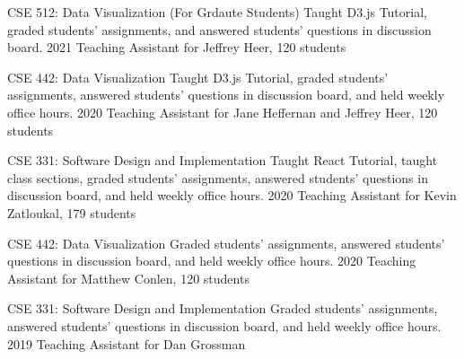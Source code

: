 

\begin{cvpubs}

  \cvteach
    {CSE 512: Data Visualization (For Grdaute Students)} %
    {Taught D3.js Tutorial, graded students' assignments, and answered students' questions in discussion board.} %
    {2021} %
    {Teaching Assistant for Jeffrey Heer, 120 students} %

  \cvteach
    {CSE 442: Data Visualization} %
    {Taught D3.js Tutorial, graded students' assignments, answered students' questions in discussion board, and held weekly office hours.} %
    {2020} %
    {Teaching Assistant for Jane Heffernan and Jeffrey Heer, 120 students} %

  \cvteach
    {CSE 331: Software Design and Implementation} %
    {Taught React Tutorial, taught class sections, graded students' assignments, answered students' questions in discussion board, and held weekly office hours.} %
    {2020} %
    {Teaching Assistant for Kevin Zatloukal, 179 students} %

  \cvteach
    {CSE 442: Data Visualization} %
    {Graded students' assignments, answered students' questions in discussion board, and held weekly office hours.} %
    {2020} %
    {Teaching Assistant for Matthew Conlen, 120 students} %

  \cvteach
    {CSE 331: Software Design and Implementation} %
    {Graded students' assignments, answered students' questions in discussion board, and held weekly office hours.} %
    {2019} %
    {Teaching Assistant for Dan Grossman} %
\end{cvpubs}
